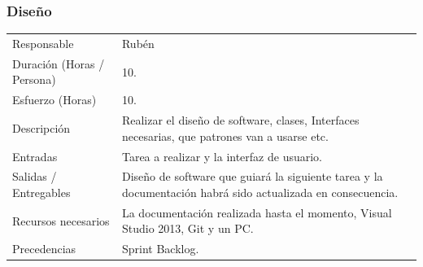 \subsubsection{Dise\~{n}o}
\begin{table}[H]
    \begin{center}
        \begin{tabular}{l p{8cm}}
            Responsable                           & Rub\'{e}n \\
            Duraci\'{o}n (Horas / Persona)        & 10. \\ 
            Esfuerzo (Horas)                      & 10. \\
            Descripci\'{o}n                       & Realizar el diseño de software, clases, Interfaces necesarias, que patrones van a usarse etc. \\
            Entradas                              & Tarea a realizar y la interfaz de usuario.\\
            Salidas / Entregables                 & Dise\~{n}o de software que guiar\'{a} la siguiente tarea y la documentaci\'{o}n
                                                    habr\'{a} sido actualizada en consecuencia. \\
            Recursos necesarios                   & La documentaci\'{o}n realizada hasta el momento, Visual Studio 2013, Git y 	un 
            										PC. \\
            Precedencias                          & Sprint Backlog. \\
        \end{tabular}
    \end{center}
    
\end{table}

